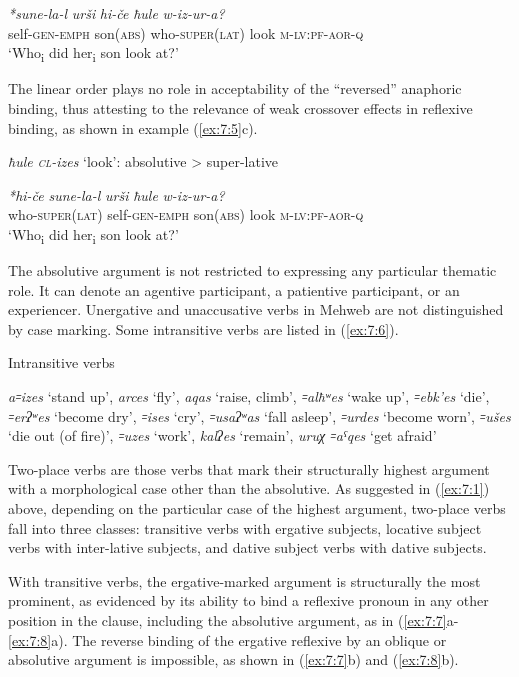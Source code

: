 ﻿\documentclass[output=paper]{langsci/langscibook}
\begin{document}
\ex %
\gll \emph{*sune-la-l} \emph{urši} \emph{hi-če} \emph{ħule} \emph{w-iz-ur-a?}\\
self-\textsc{gen}-\textsc{emph} son(\textsc{abs}) who-\textsc{super(lat)} look \textsc{m}-\textsc{lv}:\textsc{pf}-\textsc{aor}-\textsc{q}\\
\glt `Who\textsubscript{i} did her\textsubscript{i} son look at?'
\z
\z

The linear order plays no role in acceptability of the ``reversed''
anaphoric binding, thus attesting to the relevance of weak crossover
effects in reflexive binding, as shown in example (\ref{ex:7:5}c).

\addtocounter{equation}{-1}
\ea %
\emph{ħule \textup{\textsc{cl}}-izes} `look': absolutive \textgreater{} super-lative
\begin{xlist}
\gll \emph{*hi-če} \emph{sune-la-l} \emph{urši} \emph{ħule} \emph{w-iz-ur-a?}\\
who-\textsc{super(lat)} self-\textsc{gen}-\textsc{emph} son(\textsc{abs}) look \textsc{m}-\textsc{lv}:\textsc{pf}-\textsc{aor}-\textsc{q}\\
\glt `Who\textsubscript{i} did her\textsubscript{i} son look at?'
\end{xlist}
\z

The absolutive argument is not restricted to expressing any particular
thematic role. It can denote an agentive participant, a patientive
participant, or an experiencer. Unergative and unaccusative verbs in
Mehweb are not distinguished by case marking. Some intransitive
verbs are listed in (\ref{ex:7:6}).

\ea \label{ex:7:6} %
Intransitive verbs

\emph{a꞊izes} `stand up', \emph{arces} `fly', \emph{aqas} `raise,
climb', \emph{꞊alħʷes} `wake up', \emph{꞊ebk'es} `die', \emph{꞊erʔʷes}
`become dry', \emph{꞊ises} `cry', \emph{꞊usaʔʷas} `fall asleep',
\emph{꞊urdes} `become worn', \emph{꞊ušes} `die out (of fire)',
\emph{꞊uzes} `work', \emph{kalʔes} `remain', \emph{uruχ ꞊aˤqes} `get
afraid'
\z

Two-place verbs are those verbs that mark their structurally highest
argument with a morphological case other than the absolutive. As suggested
in (\ref{ex:7:1}) above, depending on the particular case of the highest argument,
two-place verbs fall into three classes: transitive verbs with ergative
subjects, locative subject verbs with inter-lative subjects, and dative
subject verbs with dative subjects.

With transitive verbs, the ergative-marked argument is structurally the
most prominent, as evidenced by its ability to bind a reflexive pronoun
in any other position in the clause, including the absolutive argument,
as in (\ref{ex:7:7}a-\ref{ex:7:8}a). The reverse binding of the ergative reflexive by an
oblique or absolutive argument is impossible, as shown in (\ref{ex:7:7}b) and (\ref{ex:7:8}b).
\end{document}
